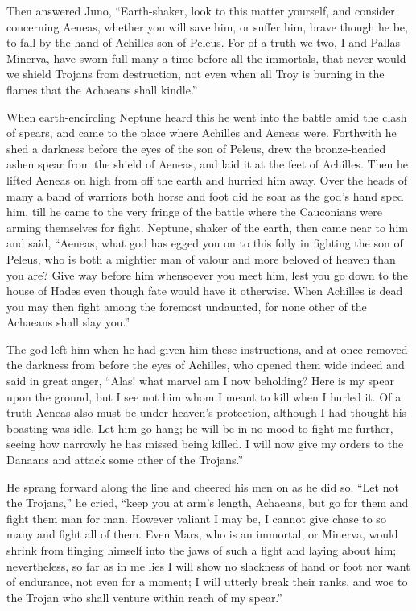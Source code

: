 Then answered Juno, “Earth-shaker, look to this matter yourself, and
consider concerning Aeneas, whether you will save him, or suffer him,
brave though he be, to fall by the hand of Achilles son of Peleus. For of
a truth we two, I and Pallas Minerva, have sworn full many a time before
all the immortals, that never would we shield Trojans from destruction,
not even when all Troy is burning in the flames that the Achaeans shall
kindle.”

When earth-encircling Neptune heard this he went into the battle amid the
clash of spears, and came to the place where Achilles and Aeneas were.
Forthwith he shed a darkness before the eyes of the son of Peleus, drew
the bronze-headed ashen spear from the shield of Aeneas, and laid it at
the feet of Achilles. Then he lifted Aeneas on high from off the earth and
hurried him away. Over the heads of many a band of warriors both horse and
foot did he soar as the god’s hand sped him, till he came to the very
fringe of the battle where the Cauconians were arming themselves for
fight. Neptune, shaker of the earth, then came near to him and said,
“Aeneas, what god has egged you on to this folly in fighting the son of
Peleus, who is both a mightier man of valour and more beloved of heaven
than you are? Give way before him whensoever you meet him, lest you go
down to the house of Hades even though fate would have it otherwise. When
Achilles is dead you may then fight among the foremost undaunted, for none
other of the Achaeans shall slay you.”

The god left him when he had given him these instructions, and at once
removed the darkness from before the eyes of Achilles, who opened them
wide indeed and said in great anger, “Alas! what marvel am I now
beholding? Here is my spear upon the ground, but I see not him whom I
meant to kill when I hurled it. Of a truth Aeneas also must be under
heaven’s protection, although I had thought his boasting was idle. Let him
go hang; he will be in no mood to fight me further, seeing how narrowly he
has missed being killed. I will now give my orders to the Danaans and
attack some other of the Trojans.”

He sprang forward along the line and cheered his men on as he did so. “Let
not the Trojans,” he cried, “keep you at arm’s length, Achaeans, but go
for them and fight them man for man. However valiant I may be, I cannot
give chase to so many and fight all of them. Even Mars, who is an
immortal, or Minerva, would shrink from flinging himself into the jaws of
such a fight and laying about him; nevertheless, so far as in me lies I
will show no slackness of hand or foot nor want of endurance, not even for
a moment; I will utterly break their ranks, and woe to the Trojan who
shall venture within reach of my spear.”

